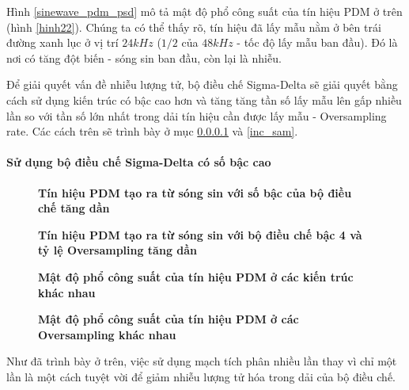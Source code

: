 Hình \ref{sinewave_pdm_psd} mô tả mật độ phổ công suất của tín hiệu PDM ở trên (hình \ref{hinh22}). Chúng ta có thể thấy rõ, tín hiệu đã lấy mẫu nằm ở bên trái đường xanh lục ở vị trí $24kHz$ ($1/2$ của $48kHz$ - tốc độ lấy mẫu ban đầu). Đó là nơi có tăng đột biến - sóng sin ban đầu, còn lại là nhiễu.

Để giải quyết vấn đề nhiễu lượng tử, bộ điều chế Sigma-Delta sẽ giải quyết bằng cách sử dụng kiến trúc có bậc cao hơn và tăng tăng tần số lấy mẫu lên gấp nhiều lần so với tần số lớn nhất trong dải tín hiệu cần được lấy mẫu - Oversampling rate. Các cách trên sẽ trình bày ở mục \ref{inc_order} và \ref{inc_sam}.
\paragraph{Sử dụng bộ điều chế Sigma-Delta có số bậc cao} \label{inc_order}
\begin{figure}
    \centering
    
    \caption[Tín hiệu PDM tạo ra từ sóng sin với số bậc của bộ điều chế tăng dần]{\bfseries \fontsize{12pt}{0pt}\selectfont Tín hiệu PDM tạo ra từ sóng sin với số bậc của bộ điều chế tăng dần}
    \label{sinewave_to_pdm_different_orders}
\end{figure}
\begin{figure}
    \centering
    
    \caption[Tín hiệu PDM tạo ra từ sóng sin với bộ điều chế bậc 4 và tỷ lệ Oversampling tăng dần]{\bfseries \fontsize{12pt}{0pt}\selectfont Tín hiệu PDM tạo ra từ sóng sin với bộ điều chế bậc 4 và tỷ lệ Oversampling tăng dần}
    \label{sinewave_to_pdm_different_osr}
\end{figure}
\begin{figure}
    \centering
    
    \caption[Mật độ phổ công suất của tín hiệu PDM ở các kiến trúc khác nhau]{\bfseries \fontsize{12pt}{0pt}\selectfont Mật độ phổ công suất của tín hiệu PDM ở các kiến trúc khác nhau}
    \label{sinewave_pdm_psd_different_orders}
\end{figure}
\begin{figure}[ht!]
    \centering
    
    \caption[Mật độ phổ công suất của tín hiệu PDM ở các Oversampling khác nhau]{\bfseries \fontsize{12pt}{0pt}\selectfont Mật độ phổ công suất của tín hiệu PDM ở các Oversampling khác nhau}
    \label{sinewave_pdm_psd_different_osr}
\end{figure}
Như đã trình bày ở trên, việc sử dụng mạch tích phân nhiều lần thay vì chỉ một lần là một cách tuyệt vời để giảm nhiễu lượng tử hóa trong dải của bộ điều chế.


